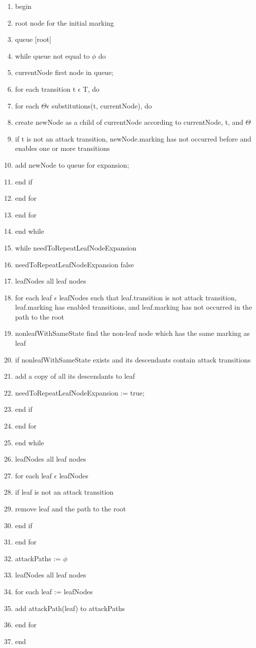 \begin{enumerate}
\item begin
\item root node for the initial marking
\item queue [root]
\item while queue not equal to $\phi$  do
\item currentNode first node in queue;
\item for each transition t $\epsilon$ T, do
\item for each $\Theta \epsilon$ substitutions(t, currentNode), do
\item create newNode as a child of currentNode according to currentNode, t, and $\Theta$
\item if t is not an attack transition, newNode.marking has not occurred before and enables one or more transitions
\item add newNode to queue for expansion;
\item end if
\item end for
\item end for
\item end while
\item while needToRepeatLeafNodeExpansion
\item needToRepeatLeafNodeExpansion false
\item leafNodes all leaf nodes
\item for each leaf $\epsilon$ leafNodes such that leaf.transition is
not attack transition, leaf.marking has enabled
transitions, and leaf.marking has not occurred in the
path to the root
\item nonleafWithSameState find the non-leaf node
which has the same marking as leaf
\item if nonleafWithSameState exists and its
descendants contain attack transitions
\item add a copy of all its descendants to leaf
\item needToRepeatLeafNodeExpansion := true;
\item end if
\item end for
\item end while
\item leafNodes all leaf nodes
\item for each leaf $\epsilon$ leafNodes
\item if leaf is not an attack transition
\item remove leaf and the path to the root
\item end if
\item end for
\item attackPaths := $\phi$
\item leafNodes all leaf nodes
\item for each leaf := leafNodes
\item add attackPath(leaf) to attackPaths
\item end for
\item end
\end{enumerate}
